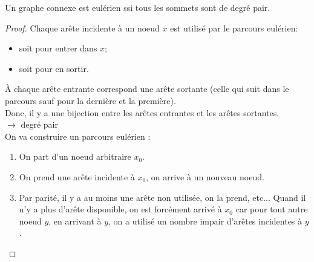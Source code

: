 \begin{mytheo} 
  Un graphe connexe est eulérien ssi tous les sommets sont de degré pair.
  \begin{proof}
    \noindent
    \newline
    \fbox{$\Longrightarrow$}
    \newline
    Chaque arête incidente à un noeud $x$ est utilisé par le parcours eulérien:
    \begin{itemize}
      \item soit pour entrer dans $x$;
      \item soit pour en sortir.
    \end{itemize}
    À chaque arête entrante correspond une arête sortante (celle qui suit dans le parcours sauf pour la dernière et la première).\\
    Donc, il y a une bijection entre les arêtes entrantes et les arêtes sortantes.\\
    $\longrightarrow$ degré pair \\

    \noindent
    \fbox{$\Longleftarrow$}
    \newline
    On va construire un parcours eulérien :
    \begin{enumerate}
      \item On part d'un noeud arbitraire $x_0$.
      \item On prend une arête incidente à $x_0$, on arrive à un nouveau noeud.
      \item Par parité, il y a au moins une arête non utilisée, on la prend, etc...
        Quand il n'y a plus d'arête disponible, on est forcément arrivé à $x_0$ car
        pour tout autre noeud $y$, en arrivant à $y$, on a utilisé un nombre impair d'arêtes incidentes à $y$.
    \end{enumerate}
    \begin{center}
\end{center}
\end{proof}
\end{mytheo}

